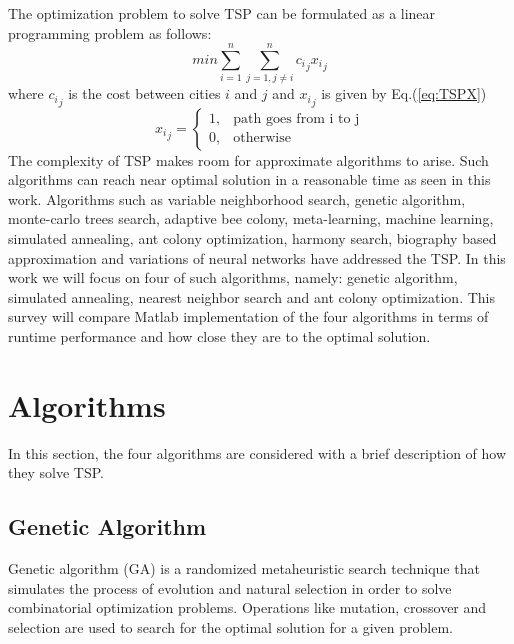 \documentclass[twocolumn]{article}
\begin{document}
	The optimization problem to solve TSP can be formulated as a linear programming problem as follows\cite{papadimitriou98}:
	\begin{equation} \label{eq:TSPLinearProgramming}
	min \sum_{i=1}^{n} \sum_{j=1, j\neq i}^{n} {c_i}_j {x_i}_j
	\end{equation}
	where ${c_i}_j$ is the cost between cities $i$ and $j$ and ${x_i}_j$ is given by Eq.(\ref{eq:TSPX})
	\begin{equation} \label{eq:TSPX}
	{x_i}_j = 
	\begin{cases}
	1,& \text{path goes from i to j}\\
	0,& \text{otherwise}
	\end{cases}
	\end{equation}
	The complexity of TSP makes room for approximate algorithms to arise\cite{Brucal17}. Such algorithms can reach near optimal solution in a reasonable time as seen in this work. Algorithms such as variable neighborhood search\cite{Thanh15}, genetic algorithm\cite{Wang17}, monte-carlo trees search\cite{Perez14}, adaptive bee colony\cite{Rekaby13}, meta-learning\cite{Kanda11}, machine learning\cite{Pihera14}, simulated annealing\cite{Kerrache14}, ant colony optimization\cite{Swiatnicki15}, harmony search\cite{Tongchan17}, biography based approximation\cite{Wu17} and variations of neural networks\cite{Gao10}\cite{Mueller15} have addressed the TSP. In this work we will focus on four of such algorithms, namely: genetic algorithm\cite{Kirk14}\cite{mathwork}, simulated annealing\cite{Jang02}, nearest neighbor search\cite{Jevtic14} and ant colony optimization\cite{Ibrahim15}. This survey will compare {Matlab\texttrademark}  implementation of the four algorithms in terms of runtime performance and how close they are to the optimal solution.
	
	\section{Algorithms}
	In this section, the four algorithms are considered with a brief description of how they solve TSP.
	\subsection{Genetic Algorithm}
	
	Genetic algorithm (GA) is a randomized metaheuristic search technique that simulates the process of evolution and natural selection in order to solve combinatorial optimization problems. Operations like mutation, crossover and selection are used to search for the optimal solution for a given problem\cite{Wang17}.
	
\end{document}
